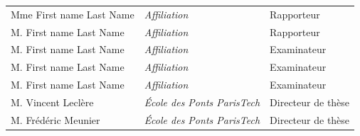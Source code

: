 \begin{tabular}{lll}
{\Large Mme First name {\sc Last Name}} & {\large{\it Affiliation}} & {\large Rapporteur}\\[0.5ex]
{\Large M. First name {\sc Last Name}} & {\large{\it Affiliation}} & {\large Rapporteur}\\[0.5ex]
{\Large M. First name {\sc Last Name}} & {\large{\it Affiliation}} & {\large Examinateur}\\[0.5ex]
{\Large M. First name {\sc Last Name}} & {\large{\it Affiliation}} & {\large Examinateur}\\[0.5ex]
{\Large M. First name {\sc Last Name}} & {\large{\it Affiliation}} & {\large Examinateur}\\[0.5ex]
{\Large M. Vincent {\sc Lecl\`ere}} & {\large{\it \'Ecole des Ponts ParisTech}} & {\large Directeur de th\`ese}\\[0.5ex]
{\Large M. Fr\'ed\'eric {\sc Meunier}} & {\large{\it \'Ecole des Ponts ParisTech}} & {\large Directeur de th\`ese}

\end{tabular}
